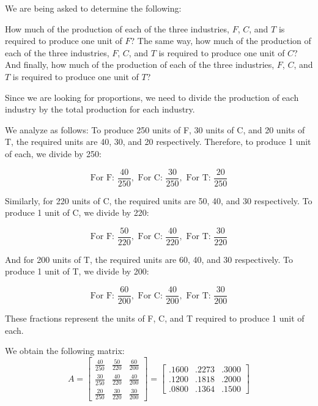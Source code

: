 \begin{solution}
    We are being asked to determine the following:

    How much of the production of each of the three industries, \( F \), \( C \), and \( T \) is required to produce one unit of \( F \)? The same way, how much of the production of each of the three industries, \( F \), \( C \), and \( T \) is required to produce one unit of \( C \)? And finally, how much of the production of each of the three industries, \( F \), \( C \), and \( T \) is required to produce one unit of \( T \)?

    Since we are looking for proportions, we need to divide the production of each industry by the total production for each industry.

    We analyze as follows:
    To produce 250 units of F, 30 units of C, and 20 units of T, the required units are 40, 30, and 20 respectively. Therefore, to produce 1 unit of each, we divide by 250:

    \[
        \text{For F: } \frac{40}{250}, \text{ For C: } \frac{30}{250}, \text{ For T: } \frac{20}{250}
    \]

    Similarly, for 220 units of C, the required units are 50, 40, and 30 respectively. To produce 1 unit of C, we divide by 220:

    \[
        \text{For F: } \frac{50}{220}, \text{ For C: } \frac{40}{220}, \text{ For T: } \frac{30}{220}
    \]

    And for 200 units of T, the required units are 60, 40, and 30 respectively. To produce 1 unit of T, we divide by 200:

    \[
        \text{For F: } \frac{60}{200}, \text{ For C: } \frac{40}{200}, \text{ For T: } \frac{30}{200}
    \]

    These fractions represent the units of F, C, and T required to produce 1 unit of each.


    We obtain the following matrix:
    \[ A = \begin{bmatrix}
            \frac{40}{250} & \frac{50}{220} & \frac{60}{200} \\
            \frac{30}{250} & \frac{40}{220} & \frac{40}{200} \\
            \frac{20}{250} & \frac{30}{220} & \frac{30}{200}
        \end{bmatrix} = \begin{bmatrix}
            .1600 & .2273 & .3000 \\
            .1200 & .1818 & .2000 \\
            .0800 & .1364 & .1500
        \end{bmatrix} \]


\end{solution}
